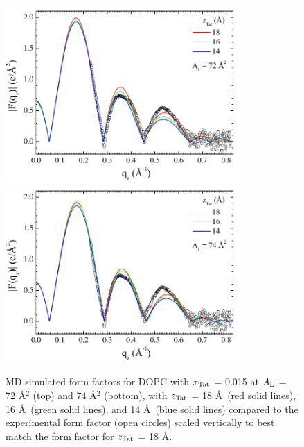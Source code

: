 \begin{figure}[p]
  \centering
  \includegraphics[width=0.8\textwidth]{figures/Tat/MD_Results/xff/dopc-tat2_72_sim-exp1}
  \includegraphics[width=0.8\textwidth]{figures/Tat/MD_Results/xff/dopc-tat2_74_sim-exp1}
  \caption[MD simulated form factors for DOPC with $\xTat$ = 0.015 
  at $\AL$ = 72 \AA$^2$ (top) and 74 \AA$^2$ (bottom),
  with $\zTat$ = 18 \AA\ (red solid lines), 16 \AA\ (green solid lines), 
  and 14 \AA\ (blue solid lines) compared to the experimental form factor 
  (open circles) scaled vertically to best match the form factor for 
  $\zTat$ = 18 \AA]
  {MD simulated form factors for DOPC with $\xTat$ = 0.015 
  at $\AL$ = 72 \AA$^2$ (top) and 74 \AA$^2$ (bottom),
  with $\zTat$ = 18 \AA\ (red solid lines), 16 \AA\ (green solid lines), 
  and 14 \AA\ (blue solid lines) compared to the experimental form factor 
  (open circles) scaled vertically to best match the form factor for 
  $\zTat$ = 18 \AA.}
  \label{fig:MD_dopc-tat2_sim-exp}
\end{figure}

